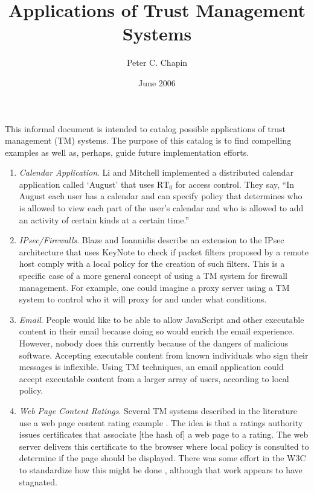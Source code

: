 \documentclass{article}
\begin{document}
\title{Applications of Trust Management Systems}
\author{Peter C. Chapin}
\date{June 2006}
\maketitle

This informal document is intended to catalog possible applications of
trust management (TM) systems. The purpose of this catalog is to find
compelling examples as well as, perhaps, guide future implementation
efforts.

\begin{enumerate}

\item \textit{Calendar Application}. Li and Mitchell \cite{Li:RRBTMF}
  implemented a distributed calendar application called `August' that uses
  $\textrm{RT}_0$ for access control. They say, ``In August each user has a
  calendar and can specify policy that determines who is allowed to view
  each part of the user's calendar and who is allowed to add an activity of
  certain kinds at a certain time.''

\item \textit{IPsec/Firewalls}. Blaze and Ioannidis \cite{Blaze:TMIPS}
  describe an extension to the IPsec architecture that uses KeyNote to
  check if packet filters proposed by a remote host comply with a local
  policy for the creation of such filters. This is a specific case of a
  more general concept of using a TM system for firewall management. For
  example, one could imagine a proxy server using a TM system to control
  who it will proxy for and under what conditions.

\item \textit{Email}. People would like to be able to allow JavaScript and
  other executable content in their email because doing so would enrich the
  email experience. However, nobody does this currently because of the
  dangers of malicious software. Accepting executable content from known
  individuals who sign their messages is inflexible. Using TM techniques,
  an email application could accept executable content from a larger array
  of users, according to local policy.

\item \textit{Web Page Content Ratings}. Several TM systems described in
  the literature use a web page content rating example
  \cite{Gunter:ADDUQCM,Chu:RTMWA}. The idea is that a ratings authority
  issues certificates that associate [the hash of] a web page to a rating.
  The web server delivers this certificate to the browser where local
  policy is consulted to determine if the page should be displayed. There
  was some effort in the W3C to standardize how this might be done
  \cite{Resnick:PIACWC}, although that work appears to have stagnated.


\end{enumerate}
\end{document}
